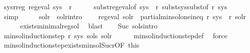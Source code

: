 \begin{isabellebody}
\ sys{\isacharunderscore}{\kern0pt}r{\isacharunderscore}{\kern0pt}reg{\isacharcolon}{\kern0pt}\ {\isachardoublequoteopen}reg{\isacharunderscore}{\kern0pt}eval\ {\isacharparenleft}{\kern0pt}{\isacharquery}{\kern0pt}sys{\isacharprime}{\kern0pt}\ {\isacharbang}{\kern0pt}\ r{\isacharparenright}{\kern0pt}{\isachardoublequoteclose}\isanewline
\ \ \ \ \isamarkupfalse%
\ subst{\isacharunderscore}{\kern0pt}reg{\isacharunderscore}{\kern0pt}eval{\isacharbrackleft}{\kern0pt}of\ {\isachardoublequoteopen}sys\ {\isacharbang}{\kern0pt}\ r{\isachardoublequoteclose}{\isacharbrackright}{\kern0pt}\ subst{\isacharunderscore}{\kern0pt}sys{\isacharunderscore}{\kern0pt}subst{\isacharbrackleft}{\kern0pt}of\ r\ sys{\isacharbrackright}{\kern0pt}\ \isamarkupfalse%
\ simp\isanewline
\ \ \isamarkupfalse%
\ \isamarkupfalse%
\ sol{\isacharunderscore}{\kern0pt}r\ \ sol{\isacharunderscore}{\kern0pt}r{\isacharunderscore}{\kern0pt}intro{\isacharcolon}{\kern0pt}\isanewline
\ \ \ \ {\isachardoublequoteopen}reg{\isacharunderscore}{\kern0pt}eval\ sol{\isacharunderscore}{\kern0pt}r\ {\isasymand}\ partial{\isacharunderscore}{\kern0pt}min{\isacharunderscore}{\kern0pt}sol{\isacharunderscore}{\kern0pt}one{\isacharunderscore}{\kern0pt}ineq\ r\ {\isacharparenleft}{\kern0pt}{\isacharquery}{\kern0pt}sys{\isacharprime}{\kern0pt}\ {\isacharbang}{\kern0pt}\ r{\isacharparenright}{\kern0pt}\ sol{\isacharunderscore}{\kern0pt}r{\isachardoublequoteclose}\isanewline
\ \ \ \ \isamarkupfalse%
\ exists{\isacharunderscore}{\kern0pt}minimal{\isacharunderscore}{\kern0pt}reg{\isacharunderscore}{\kern0pt}sol\ \isamarkupfalse%
\ blast\isanewline
\isanewline
\ \ \isamarkupfalse%
\ Suc\ sols{\isacharunderscore}{\kern0pt}intro\ \isamarkupfalse%
\ {\isachardoublequoteopen}min{\isacharunderscore}{\kern0pt}sol{\isacharunderscore}{\kern0pt}induction{\isacharunderscore}{\kern0pt}step\ r\ sys\ sols\ sol{\isacharunderscore}{\kern0pt}r{\isachardoublequoteclose}\isanewline
\ \ \ \ \isamarkupfalse%
\ min{\isacharunderscore}{\kern0pt}sol{\isacharunderscore}{\kern0pt}induction{\isacharunderscore}{\kern0pt}step{\isacharunderscore}{\kern0pt}def\ \isamarkupfalse%
\ force\isanewline
\ \ \isamarkupfalse%
\ min{\isacharunderscore}{\kern0pt}sol{\isacharunderscore}{\kern0pt}induction{\isacharunderscore}{\kern0pt}step{\isachardot}{\kern0pt}exists{\isacharunderscore}{\kern0pt}min{\isacharunderscore}{\kern0pt}sol{\isacharunderscore}{\kern0pt}Suc{\isacharunderscore}{\kern0pt}r{\isacharbrackleft}{\kern0pt}OF\ this{\isacharbrackright}{\kern0pt}\ \isamarkupfalse%

\end{isabellebody}
